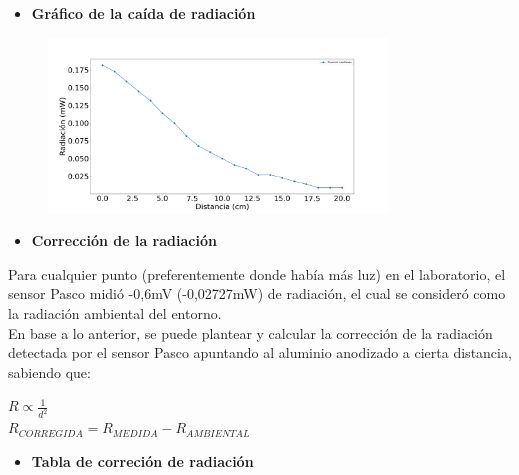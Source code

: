 \documentclass[a4paper]{article}
\begin{document}
		\begin{itemize}
			\vspace{5mm}
			\item \textbf{Gráfico de la caída de radiación}
			\vspace{-3mm}			
		\end{itemize}
	
        \begin{figure}[h!]
			\centering
			\includegraphics[width=9cm]{./graficoRadiacionDistancia.png}
		\end{figure}
		
		\begin{itemize}
			\vspace{0mm}
			\item \textbf{Corrección de la radiación}
			\vspace{-3mm}			
		\end{itemize}
		
		\indent Para cualquier punto (preferentemente donde había más luz) en el laboratorio, el sensor Pasco midió -0,6mV (-0,02727mW) de radiación, el cual se consideró como la radiación ambiental del entorno. \\
		\indent En base a lo anterior, se puede plantear y calcular la corrección de la radiación detectada por el sensor Pasco apuntando al aluminio anodizado a cierta distancia, sabiendo que: \\
		
		\begin{center}
			$R \propto \frac{1}{d^2}$ \\
			$R_{CORREGIDA} = R_{MEDIDA} - R_{AMBIENTAL}$ \\
		\end{center}
		
		\newpage
		\noindent
		
		\begin{itemize}
			\vspace{0mm}
			\item \textbf{Tabla de correción de radiación}
			\vspace{-3mm}			
		\end{itemize}
		
\end{document}
